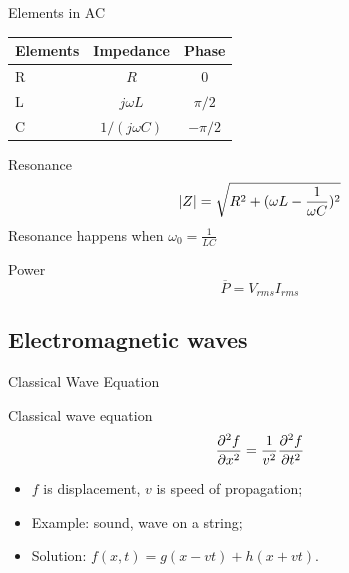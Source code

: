 \documentclass{beamer}
\begin{document}
\begin{frame}{Elements in AC}
    \begin{table}[htbp]
        \centering
        \begin{tabular}{l c c}
            \toprule
            Elements & Impedance        & Phase    \\
            \midrule
            R        & $R$              & 0        \\
            L        & $j\omega L $     & $\pi/2$  \\
            C        & $1/(j \omega C)$ & $-\pi/2$ \\
            \bottomrule
        \end{tabular}
    \end{table}

    \begin{block}{Resonance}
        \begin{equation}
            \abs{Z} = \sqrt{R^2+(\omega L - \frac{1}{\omega C})^2 }
        \end{equation}
        Resonance happens when $\omega_0 = \frac{1}{LC}$
    \end{block}

    \begin{block}{ Power}
        \begin{equation}
            \overline{P} = V_{rms} I_{rms}
        \end{equation}
    \end{block}
\end{frame}

\subsection{Electromagnetic waves}

\begin{frame}{Classical Wave Equation}
    \begin{block}{Classical wave equation}
        \begin{equation}
            \pdv[2]{f}{x} = \frac{1}{v^2} \pdv[2]{f}{t}
        \end{equation}
    \end{block}
    \vfill
    \begin{itemize}
        \item $f$ is displacement, $v$ is speed of propagation;
        \item Example: sound, wave on a string;
        \item Solution: $f(x, t) = g(x - vt) + h(x + vt)$.
    \end{itemize}
\end{frame}
\end{document}
